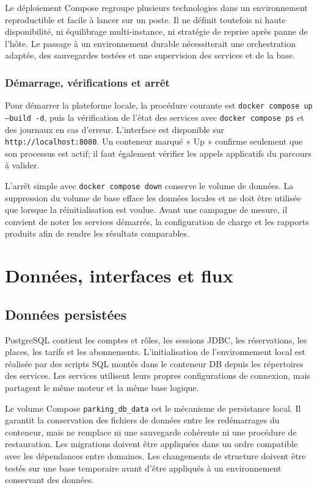 \documentclass[11pt,a4paper]{report}
\begin{document}
Le déploiement Compose regroupe plusieurs technologies dans un environnement reproductible et facile à lancer sur un poste. Il ne définit toutefois ni haute disponibilité, ni équilibrage multi-instance, ni stratégie de reprise après panne de l'hôte. Le passage à un environnement durable nécessiterait une orchestration adaptée, des sauvegardes testées et une supervision des services et de la base.

\subsection{Démarrage, vérifications et arrêt}
Pour démarrer la plateforme locale, la procédure courante est \texttt{docker compose up --build -d}, puis la vérification de l'état des services avec \texttt{docker compose ps} et des journaux en cas d'erreur. L'interface est disponible sur \texttt{http://localhost:8080}. Un conteneur marqué « Up » confirme seulement que son processus est actif; il faut également vérifier les appels applicatifs du parcours à valider.

L'arrêt simple avec \texttt{docker compose down} conserve le volume de données. La suppression du volume de base efface les données locales et ne doit être utilisée que lorsque la réinitialisation est voulue. Avant une campagne de mesure, il convient de noter les services démarrés, la configuration de charge et les rapports produits afin de rendre les résultats comparables.

\chapter{Données, interfaces et flux}
\section{Données persistées}
PostgreSQL contient les comptes et rôles, les sessions JDBC, les réservations, les places, les tarifs et les abonnements. L'initialisation de l'environnement local est réalisée par des scripts SQL montés dans le conteneur DB depuis les répertoires des services. Les services utilisent leurs propres configurations de connexion, mais partagent le même moteur et la même base logique.

Le volume Compose \texttt{parking\_db\_data} est le mécanisme de persistance local. Il garantit la conservation des fichiers de données entre les redémarrages du conteneur, mais ne remplace ni une sauvegarde cohérente ni une procédure de restauration. Les migrations doivent être appliquées dans un ordre compatible avec les dépendances entre domaines. Les changements de structure doivent être testés sur une base temporaire avant d'être appliqués à un environnement conservant des données.
\end{document}
